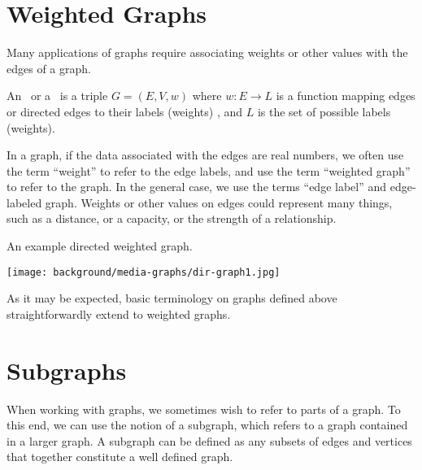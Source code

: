 \section{Weighted Graphs} 
\label{sec:bg::graphs::weighted}
\begin{gram}
Many applications of graphs require associating weights or other
values with the edges of a graph.  
\end{gram}

\begin{definition}
\label{def:bg::graphs::weighted}
An ~or a ~is a triple
$G = (E,V,w)$ where $w\!: E \to L$ is a function mapping edges or
directed edges to their labels (weights) , and $L$ is the set of
possible labels (weights).
\end{definition}

\begin{gram}
In a graph, if the data associated with the edges are real numbers, we
often use the term ``weight'' to refer to the edge labels, and use the
term ``weighted graph'' to refer to the graph.  In the general case,
we use the terms ``edge label'' and edge-labeled graph.  Weights or
other values on edges could represent many things, such as a distance,
or a capacity, or the strength of a relationship.
\end{gram}

\begin{example}
An example directed weighted graph.

\begin{center}
\texttt{[image: background/media-graphs/dir-graph1.jpg]}
\end{center}

\end{example}

\begin{remark}
As it may be expected, basic terminology on graphs defined above
straightforwardly extend to weighted graphs.
\end{remark}

\section{Subgraphs}
\label{sec:bg::graphs::subgraphs}

\begin{gram}
When working with graphs, we sometimes wish to refer to parts of a
graph.  To this end, we can use the notion of a subgraph, which refers
to a graph contained in a larger graph. A subgraph can be defined as
any subsets of edges and vertices that together constitute a well
defined graph.
\end{gram}

